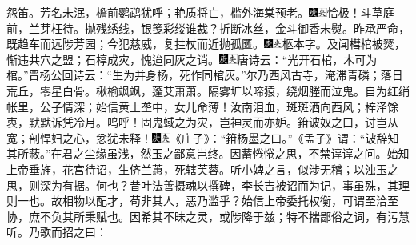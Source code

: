 怨笛。芳名未泯，檐前鹦鹉犹呼；艳质将亡，槛外海棠预老。{\includegraphics[width=3mm]{../Images/00004}\includegraphics[width=3mm]{../Images/00012}\footnotesize \kaishu 恰极！}斗草庭前，兰芽枉待。抛残绣线，银笺彩缕谁裁？折断冰丝，金斗御香未熨。昨承严命，既趋车而远陟芳园；今犯慈威，复拄杖而近抛孤匶。{\includegraphics[width=3mm]{../Images/00004}\includegraphics[width=3mm]{../Images/00012}\footnotesize \kaishu 柩本字。}及闻槥棺被燹，惭违共穴之盟；石椁成灾，愧迨同灰之诮。{\includegraphics[width=3mm]{../Images/00004}\includegraphics[width=3mm]{../Images/00012}\footnotesize \kaishu 唐诗云：``光开石棺，木可为棺。''晋杨公回诗云：``生为并身杨，死作同棺灰。''}尔乃西风古寺，淹滞青磷；落日荒丘，零星白骨。楸榆飒飒，蓬艾萧萧。隔雾圹以啼猿，绕烟塍而泣鬼。自为红绡帐里，公子情深；始信黄土垄中，女儿命薄！汝南泪血，斑斑洒向西风；梓泽馀衷，默默诉凭冷月。呜呼！固鬼蜮之为灾，岂神灵而亦妒。箝诐奴之口，讨岂从宽；剖悍妇之心，忿犹未释！{{\includegraphics[width=3mm]{../Images/00004}\includegraphics[width=3mm]{../Images/00012}\footnotesize \kaishu 《庄子》：``箝杨墨之口。''《孟子》谓：``}诐{辞知其所蔽。''}}在君之尘缘虽浅，然玉之鄙意岂终。因蓄惓惓之思，不禁谆谆之问。始知上帝垂旌，花宫待诏，生侪兰蕙，死辖芙蓉。听小婢之言，似涉无稽；以浊玉之思，则深为有据。何也？昔叶法善摄魂以撰碑，李长吉被诏而为记，事虽殊，其理则一也。故相物以配才，苟非其人，恶乃滥乎？始信上帝委托权衡，可谓至洽至协，庶不负其所秉赋也。因希其不昧之灵，或陟降于兹；特不揣鄙俗之词，有污慧听。乃歌而招之曰：

